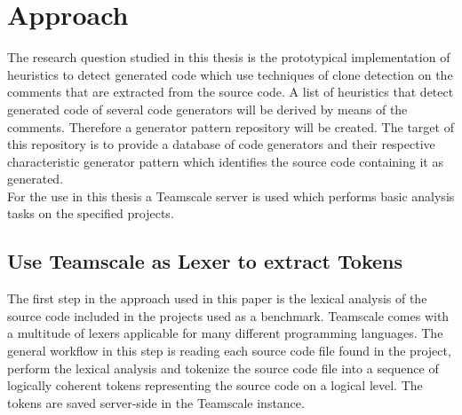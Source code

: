 
\chapter{Approach}\label{chapter:approach}
The research question studied in this thesis is the prototypical implementation of heuristics to detect generated code which use techniques of clone detection on the comments that are extracted from the source code. A list of heuristics that detect generated code of several code generators will be derived by means of the comments. Therefore a generator pattern repository will be created. The target of this repository is to provide a database of code generators and their respective characteristic generator pattern which identifies the source code containing it as generated.\\
For the use in this thesis a Teamscale server is used which performs basic analysis tasks on the specified projects.
\section{Use Teamscale as Lexer to extract Tokens}
The first step in the approach used in this paper is the lexical analysis of the source code included in the projects used as a benchmark. Teamscale comes with a multitude of lexers applicable for many different programming languages. The general workflow in this step is reading each source code file found in the project, perform the lexical analysis and tokenize the source code file into a sequence of logically coherent tokens representing the source code on a logical level. The tokens are saved server-side in the Teamscale instance.



